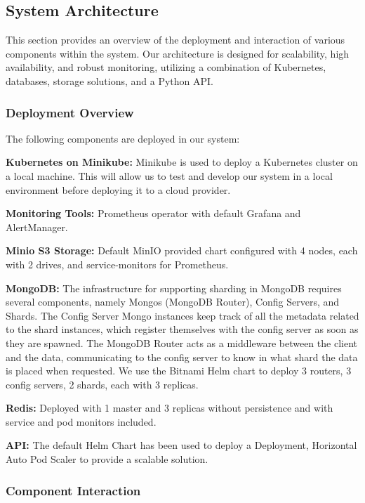 \documentclass{report}
\begin{document}
    \subsection{System Architecture}
    This section provides an overview of the deployment and interaction of various components within the system. Our architecture is designed for scalability, high availability, and robust monitoring, utilizing a combination of Kubernetes, databases, storage solutions, and a Python API.

    \subsubsection{Deployment Overview}
    The following components are deployed in our system:

    \textbf{Kubernetes on Minikube:} Minikube is used to deploy a Kubernetes cluster on a local machine. This will allow us to test and develop our system in a local environment before deploying it to a cloud provider.

    \textbf{Monitoring Tools:} Prometheus operator with default Grafana and AlertManager.

    \textbf{Minio S3 Storage:} Default MinIO provided chart configured with 4 nodes, each with 2 drives, and service-monitors for Prometheus.

    \textbf{MongoDB:} The infrastructure for supporting sharding in MongoDB requires several components, namely Mongos (MongoDB Router), Config Servers, and Shards. The Config Server Mongo instances keep track of all the metadata related to the shard instances, which register themselves with the config server as soon as they are spawned. The MongoDB Router acts as a middleware between the client and the data, communicating to the config server to know in what shard the data is placed when requested. We use the Bitnami Helm chart to deploy 3 routers, 3 config servers, 2 shards, each with 3 replicas.

    \textbf{Redis:} Deployed with 1 master and 3 replicas without persistence and with service and pod monitors included.

    \textbf{API:} The default Helm Chart has been used to deploy a Deployment, Horizontal Auto Pod Scaler to provide a scalable solution.

    \subsubsection{Component Interaction}
\end{document}

